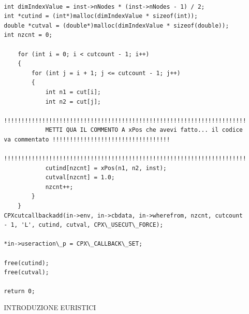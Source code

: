 \documentclass[11pt]{article}
\begin{document}
\begin{lstlisting}

int dimIndexValue = inst->nNodes * (inst->nNodes - 1) / 2;
int *cutind = (int*)malloc(dimIndexValue * sizeof(int));
double *cutval = (double*)malloc(dimIndexValue * sizeof(double));
int nzcnt = 0;

    for (int i = 0; i < cutcount - 1; i++)
    {
        for (int j = i + 1; j <= cutcount - 1; j++)
        {
            int n1 = cut[i];
            int n2 = cut[j];
            !!!!!!!!!!!!!!!!!!!!!!!!!!!!!!!!!!!!!!!!!!!!!!!!!!!!!!!!!!!!!!!!!!!!!!!!!!!!!!!!!!!!!!!!!!!!!!!!!!!!!!!!!!
            METTI QUA IL COMMENTO A xPos che avevi fatto... il codice va commentato !!!!!!!!!!!!!!!!!!!!!!!!!!!!!!!!!!
            !!!!!!!!!!!!!!!!!!!!!!!!!!!!!!!!!!!!!!!!!!!!!!!!!!!!!!!!!!!!!!!!!!!!!!!!!!!!!!!!!!!!!!!!!!!!!!!!!!!!!!!!!!
            cutind[nzcnt] = xPos(n1, n2, inst);
            cutval[nzcnt] = 1.0;
            nzcnt++;
        }
    }
CPXcutcallbackadd(in->env, in->cbdata, in->wherefrom, nzcnt, cutcount - 1, 'L', cutind, cutval, CPX\_USECUT\_FORCE);

*in->useraction\_p = CPX\_CALLBACK\_SET;

free(cutind);
free(cutval);

return 0;

\end{lstlisting}



\vspace{2\baselineskip}
INTRODUZIONE EURISTICI
\vspace{2\baselineskip}
\end{document}
